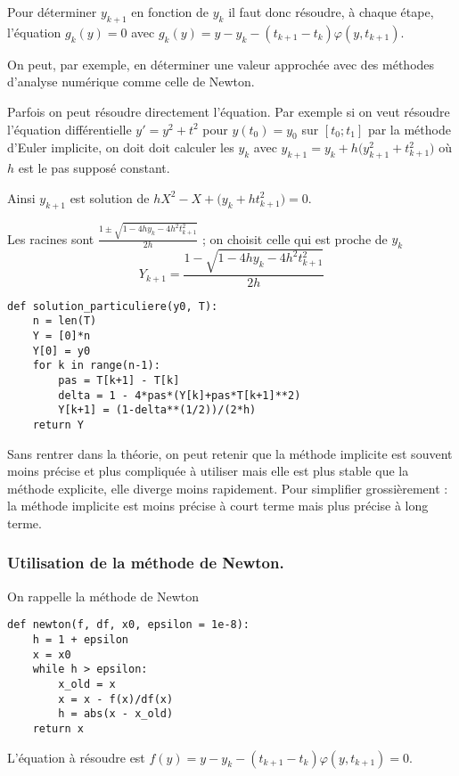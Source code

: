 Pour déterminer $y_{k+1}$ en fonction de $y_k$ il faut donc résoudre, à chaque étape, 
l'équation $g_k(y)=0$ avec $g_k(y)= y-y_k - (t_{k+1}-t_k) \varphi(y, t_{k+1})$. 

On peut, par exemple, en déterminer une valeur approchée avec des méthodes d'analyse numérique comme celle de Newton.

\medskip 

Parfois on peut résoudre directement l'équation. Par exemple si on veut résoudre l'équation différentielle $y'=y^2+t^2$ pour $y(t_0)=y_0$ sur $[t_0;t_1]$ par la méthode d'Euler implicite, on doit doit calculer les $y_k$ avec  $y_{k+1} = y_k + h \bigl(y_{k+1}^2+t_{k+1}^2\bigr)$ où $h$ est le pas supposé constant.

Ainsi $y_{k+1}$ est solution de $h X^2-X+\bigl(y_k+ht_{k+1}^2\bigr)=0$.

Les racines sont $\displaystyle \frac{1\pm\sqrt{1-4hy_k-4h^2t_{k+1}^2}}{2h}$ ; on choisit celle qui est proche de $y_k$ 
\[Y_{k+1} = \frac{1 - \sqrt{1-4hy_k-4h^2t_{k+1}^2}}{2h}\]
\begin{lstlisting}
def solution_particuliere(y0, T):
    n = len(T)
    Y = [0]*n 
    Y[0] = y0
    for k in range(n-1): 
        pas = T[k+1] - T[k]
        delta = 1 - 4*pas*(Y[k]+pas*T[k+1]**2)
        Y[k+1] = (1-delta**(1/2))/(2*h)
    return Y
\end{lstlisting}
\medskip

Sans rentrer dans la théorie, on peut retenir que la méthode  implicite est souvent moins précise et  plus compliquée à utiliser mais elle est  plus stable  que la méthode  explicite, elle diverge moins rapidement.
Pour simplifier grossièrement  : la méthode implicite est moins précise à court terme mais plus précise à long terme.
\subsubsection{Utilisation de la méthode de Newton.}
On rappelle la méthode de Newton
\begin{lstlisting}
def newton(f, df, x0, epsilon = 1e-8):
    h = 1 + epsilon
    x = x0
    while h > epsilon:
        x_old = x
        x = x - f(x)/df(x)
        h = abs(x - x_old)
    return x    
\end{lstlisting}
L'équation à résoudre est $f(y) = y-y_k - (t_{k+1}-t_k) \varphi(y, t_{k+1})=0$.

